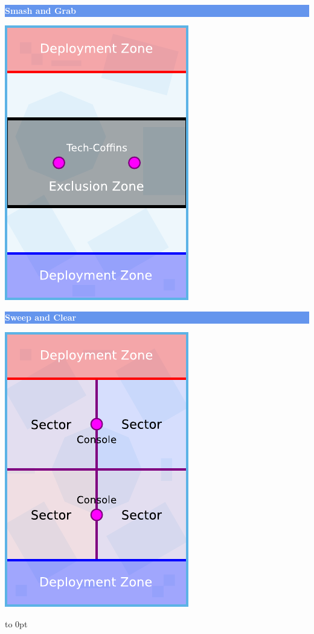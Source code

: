 \documentclass[14pt,dvipsnames]{extarticle}
\begin{document}
\vspace{-0.5em}
\noindent\hfill
\begin{minipage}{2in}\centering
\colorbox{CornflowerBlue}{\parbox[t][12pt]{\linewidth-2\fboxsep}{\centering\textcolor{White}{\textbf{Smash and Grab}}}}

\smallskip
\includegraphics[scale=0.9]{maps/map-smashandgrab}
\end{minipage}
\hfill
\begin{minipage}{2in}\centering
\colorbox{CornflowerBlue}{\parbox[t][12pt]{\linewidth}{\centering\textcolor{White}{\textbf{Sweep and Clear}}}}

\smallskip
\includegraphics[scale=0.9]{maps/map-sweepandclear}
\end{minipage}
%
\hfill
\hbox to 0pt{}
\end{document}
